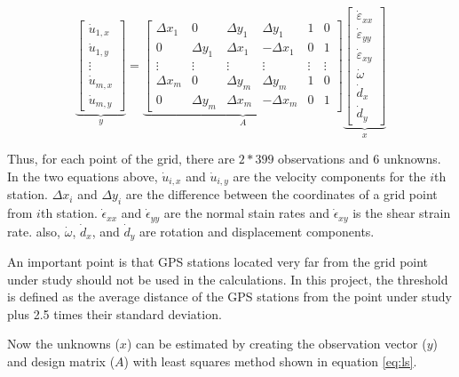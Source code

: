 \documentclass[12pt]{article}
\begin{document}
	\begin{equation}
		\underbrace{
			\begin{bmatrix}
				\dot{u}_{1,x} \\[2pt]
				\dot{u}_{1,y} \\[2pt]
				\vdots \\[2pt]
				\dot{u}_{m,x} \\[2pt]
				\dot{u}_{m,y}
		\end{bmatrix}}_{y}
		=
		\underbrace{
			\begin{bmatrix}
				\Delta x_{1} & 0 & \Delta y_{1} & \Delta y_{1} & 1 & 0 \\
				0 & \Delta y_{1} & \Delta x_{1} & -\Delta x_{1} & 0 & 1 \\
				\vdots & \vdots & \vdots & \vdots & \vdots & \vdots \\
				\Delta x_{m} & 0 & \Delta y_{m} & \Delta y_{m} & 1 & 0 \\
				0 & \Delta y_{m} & \Delta x_{m} & -\Delta x_{m} & 0 & 1
		\end{bmatrix}}_{A}
		\underbrace{
			\begin{bmatrix}
				\dot{\varepsilon}_{xx} \\[2pt]
				\dot{\varepsilon}_{yy} \\[2pt]
				\dot{\varepsilon}_{xy} \\[2pt]
				\dot{\omega} \\[2pt]
				\dot{d}_{x} \\[2pt]
				\dot{d}_{y}
		\end{bmatrix}}_{x}
	\label{eq:methodmat}
	\end{equation}
	
	Thus, for each point of the grid, there are $2*399$ observations and $6$ unknowns. In the two equations above, $\dot{u}_{i,x}$ and $\dot{u}_{i,y}$ are the velocity components for the $i$th station. $\Delta x_i$ and $\Delta y_i$ are the difference between the coordinates of a grid point from $i$th station. $\dot{\epsilon}_{xx}$ and $\dot{\epsilon}_{yy}$ are the normal stain rates and $\dot{\epsilon}_{xy}$ is the shear strain rate. also, $\dot{\omega}$, $\dot{d}_{x}$, and $\dot{d}_{y}$ are rotation and displacement components.
	
	An important point is that GPS stations located very far from the grid point under study should not be used in the calculations. In this project, the threshold is defined as the average distance of the GPS stations from the point under study plus 2.5 times their standard deviation.
	
	Now the unknowns ($x$) can be estimated by creating the observation vector ($y$) and design matrix ($A$) with least squares method shown in equation \ref{eq:ls}.
	
\end{document}
